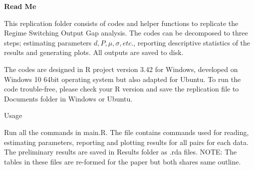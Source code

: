 \documentclass{article}
\begin{document}
\begin{center}
	\Large \bf Read Me 
\end{center}
This replication folder consists of codes and helper functions to replicate the Regime Switching Output Gap analysis. The codes can be decomposed to three steps; estimating parameters $ d,P,\mu,\sigma, etc. $, reporting descriptive statistics of the results and generating plots. All outputs are saved to disk.

The codes are designed in R project version 3.42 for Windows, developed on Windows 10 64bit operating system but also adapted for Ubuntu. To run the code trouble-free, please check your R version and save the replication file to Documents folder in Windows or Ubuntu.
\sloppy
\begin{flushleft}
	\large Usage
\end{flushleft}
Run all the commands in main.R. The file contains commands used for reading, estimating parameters, reporting and plotting results for all pairs for each data. The preliminary results are saved in Results folder as .rda files. NOTE: The tables in these files are re-formed for the paper but both shares same outline.
\end{document}
